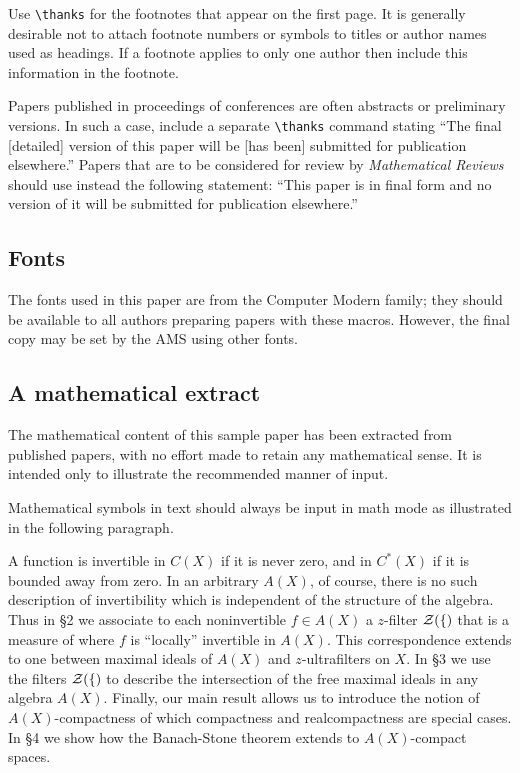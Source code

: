 Use \verb+\thanks+ for the footnotes that appear on the first page.  It is
generally desirable not to attach footnote numbers or symbols to titles or
author names used as headings.  If a footnote applies to only one author then
include this information in the footnote.

Papers published in proceedings of conferences are often abstracts or
preliminary versions.  In such a case, include a separate \verb+\thanks+
command stating ``The final
[detailed] version of this paper will be [has been] submitted for
publication elsewhere.''  Papers that are to be considered for review
by {\it Mathematical Reviews\/} should use instead
the following statement:
``This paper is in final form and no version of it will be submitted
for publication elsewhere.''

\subsection{Fonts}
The fonts used in this paper are from the Computer Modern family; they
should be available to all authors preparing papers with these macros.
However, the final copy may be set by the AMS using other fonts.  

\subsection{A mathematical extract}
The mathematical content of this sample paper has been extracted from
published papers, with no effort made to retain any mathematical sense.
It is intended only to illustrate the recommended manner of input.

Mathematical symbols in text should always be input in math mode as
illustrated in the following paragraph.

A function is invertible in $C(X)$ if it is never zero, and in $C^*(X)$ if
it is bounded away from zero. In an arbitrary $A(X)$, of course, there
is no such description of invertibility which is independent of the 
structure of the algebra. Thus in \S 2 we associate to each noninvertible
$f\in A(X)$ a $z$-filter $\cal Z (f)$ that is a measure of where
$f$ is ``locally'' invertible in $A(X)$. This correspondence extends to
one between maximal ideals of $A(X)$ and $z$-ultrafilters on $X$.
In \S 3 we use the filters $\cal Z (f)$ to describe the intersection of 
the free maximal ideals in any algebra $A(X)$. Finally, our main result
allows us to introduce the notion of $A(X)$-compactness of which 
compactness and realcompactness are special cases. In \S 4 we show how
the Banach-Stone theorem extends to $A(X)$-compact spaces.

